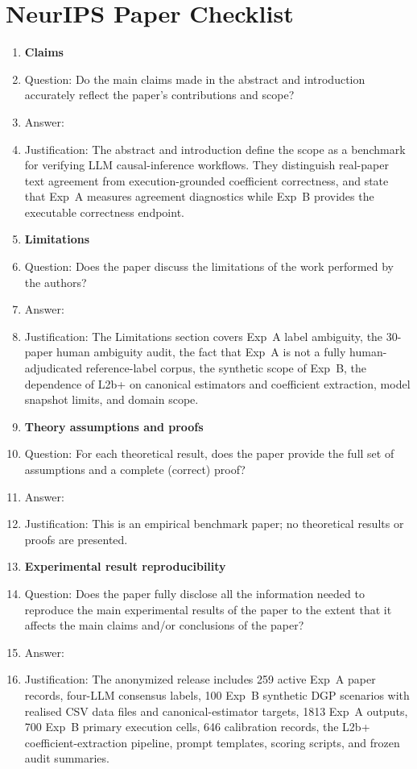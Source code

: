 
\section*{NeurIPS Paper Checklist}

\begin{enumerate}

\item {\bf Claims}
    \item[] Question: Do the main claims made in the abstract and introduction accurately reflect the paper's contributions and scope?
    \item[] Answer: \answerYes{}
    \item[] Justification: The abstract and introduction define the scope as a benchmark for verifying LLM causal-inference workflows. They distinguish real-paper text agreement from execution-grounded coefficient correctness, and state that Exp~A measures agreement diagnostics while Exp~B provides the executable correctness endpoint.

\item {\bf Limitations}
    \item[] Question: Does the paper discuss the limitations of the work performed by the authors?
    \item[] Answer: \answerYes{}
    \item[] Justification: The Limitations section covers Exp~A label ambiguity, the 30-paper human ambiguity audit, the fact that Exp~A is not a fully human-adjudicated reference-label corpus, the synthetic scope of Exp~B, the dependence of L2b+ on canonical estimators and coefficient extraction, model snapshot limits, and domain scope.

\item {\bf Theory assumptions and proofs}
    \item[] Question: For each theoretical result, does the paper provide the full set of assumptions and a complete (correct) proof?
    \item[] Answer: \answerNA{}
    \item[] Justification: This is an empirical benchmark paper; no theoretical results or proofs are presented.

\item {\bf Experimental result reproducibility}
    \item[] Question: Does the paper fully disclose all the information needed to reproduce the main experimental results of the paper to the extent that it affects the main claims and/or conclusions of the paper?
    \item[] Answer: \answerYes{}
\item[] Justification: The anonymized release includes 259 active Exp~A paper records, four-LLM consensus labels, 100 Exp~B synthetic DGP scenarios with realised CSV data files and canonical-estimator targets, 1813 Exp~A outputs, 700 Exp~B primary execution cells, 646 calibration records, the L2b+ coefficient-extraction pipeline, prompt templates, scoring scripts, and frozen audit summaries.


\end{enumerate}
